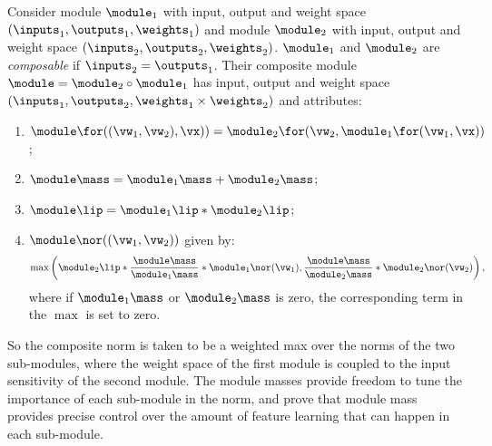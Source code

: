 \begin{mydefinition}\label{def:composition} Consider module $\module_1$ with input, output and weight space $(\inputs_1,\outputs_1,\weights_1)$ and module $\module_2$ with input, output and weight space $(\inputs_2,\outputs_2,\weights_2)$. $\module_1$ and $\module_2$ are \textit{composable} if $\inputs_2 = \outputs_1$. Their composite module $\module=\module_2\circ\module_1$ has input, output and weight space $(\inputs_1,\outputs_2,\weights_1 \times \weights_2)$ and attributes:
\begin{enumerate}[label=\normalfont(\alph*)]
\setlength\itemsep{0em}
\item $\module\for((\vw_1,\vw_2),\vx)) = \module_2\for(\vw_2,\module_1\for(\vw_1,\vx))$;%

\item $\module\mass = \module_1\mass + \module_2\mass$;%

\item $\module\lip = \module_1\lip * \module_2\lip$;%

\item $\module\nor((\vw_1, \vw_2))$ given by:
\begin{equation*}\label{eq:norm_composition}
     \max\left(
    \module_2\lip * \frac{\module\mass}{\module_1\mass} * \module_1\nor(\vw_1),
    \frac{\module\mass}{\module_2\mass} * \module_2\nor(\vw_2)\right),
\end{equation*}
where if $\module_1\mass$ or $\module_2\mass$ is zero, the corresponding term in the $\max$ is set to zero.
\end{enumerate}
\end{mydefinition}
So the composite norm is taken to be a weighted max over the norms of the two sub-modules, where the weight space of the first module is coupled to the input sensitivity of the second module. The module masses provide freedom to tune the importance of each sub-module in the norm, and \citet{modula} prove that module mass provides precise control over the amount of feature learning that can happen in each sub-module.

